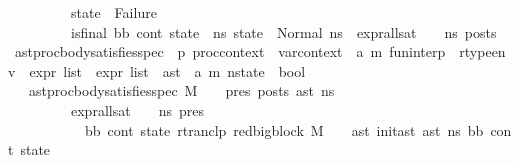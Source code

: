 \begin{isabellebody}
\ \ \ \ \ \ \ \ \ state\ {\isasymnoteq}\ Failure\ {\isasymand}\ \isanewline
\ \ \ \ \ \ \ \ \ {\isacharparenleft}{\kern0pt}is{\isacharunderscore}{\kern0pt}final\ {\isacharparenleft}{\kern0pt}bb{\isacharcomma}{\kern0pt}\ cont{\isacharcomma}{\kern0pt}\ state{\isacharparenright}{\kern0pt}\ {\isasymlongrightarrow}\ {\isacharparenleft}{\kern0pt}{\isasymforall}ns{\isacharprime}{\kern0pt}{\isachardot}{\kern0pt}\ state\ {\isacharequal}{\kern0pt}\ Normal\ ns{\isacharprime}{\kern0pt}\ {\isasymlongrightarrow}\ expr{\isacharunderscore}{\kern0pt}all{\isacharunderscore}{\kern0pt}sat\ {\isasymLambda}\ {\isasymGamma}\ {\isasymOmega}\ ns{\isacharprime}{\kern0pt}\ posts{\isacharparenright}{\kern0pt}{\isacharparenright}{\kern0pt}{\isachardoublequoteclose}\isanewline
\isanewline
{}\isamarkupfalse%
\ ast{\isacharunderscore}{\kern0pt}proc{\isacharunderscore}{\kern0pt}body{\isacharunderscore}{\kern0pt}satisfies{\isacharunderscore}{\kern0pt}spec\ {\isacharcolon}{\kern0pt}{\isacharcolon}{\kern0pt}\ {\isachardoublequoteopen}{\isacharprime}{\kern0pt}p\ proc{\isacharunderscore}{\kern0pt}context\ {\isasymRightarrow}\ var{\isacharunderscore}{\kern0pt}context\ {\isasymRightarrow}\ {\isacharparenleft}{\kern0pt}{\isacharprime}{\kern0pt}a{\isacharcomma}{\kern0pt}\ {\isacharprime}{\kern0pt}m{\isacharparenright}{\kern0pt}\ fun{\isacharunderscore}{\kern0pt}interp\ {\isasymRightarrow}\ rtype{\isacharunderscore}{\kern0pt}env\ {\isasymRightarrow}\ expr\ list\ {\isasymRightarrow}\ expr\ list\ {\isasymRightarrow}\ ast\ {\isasymRightarrow}\ {\isacharparenleft}{\kern0pt}{\isacharprime}{\kern0pt}a{\isacharcomma}{\kern0pt}\ {\isacharprime}{\kern0pt}m{\isacharparenright}{\kern0pt}\ nstate\ {\isasymRightarrow}\ bool{\isachardoublequoteclose}\isanewline
\ \ \ {\isachardoublequoteopen}ast{\isacharunderscore}{\kern0pt}proc{\isacharunderscore}{\kern0pt}body{\isacharunderscore}{\kern0pt}satisfies{\isacharunderscore}{\kern0pt}spec\ M\ {\isasymLambda}\ {\isasymGamma}\ {\isasymOmega}\ pres\ posts\ ast\ ns\ {\isasymequiv}\isanewline
\ \ \ \ \ \ \ \ \ expr{\isacharunderscore}{\kern0pt}all{\isacharunderscore}{\kern0pt}sat\ {\isasymLambda}\ {\isasymGamma}\ {\isasymOmega}\ ns\ pres\ {\isasymlongrightarrow}\ \isanewline
\ \ \ \ \ \ \ \ \ \ {\isacharparenleft}{\kern0pt}{\isasymforall}\ bb\ cont\ state{\isachardot}{\kern0pt}\ {\isacharparenleft}{\kern0pt}rtranclp\ {\isacharparenleft}{\kern0pt}red{\isacharunderscore}{\kern0pt}bigblock\ M\ {\isasymLambda}\ {\isasymGamma}\ {\isasymOmega}\ ast{\isacharparenright}{\kern0pt}\ {\isacharparenleft}{\kern0pt}init{\isacharunderscore}{\kern0pt}ast\ ast\ ns{\isacharparenright}{\kern0pt}\ {\isacharparenleft}{\kern0pt}bb{\isacharcomma}{\kern0pt}\ cont{\isacharcomma}{\kern0pt}\ state{\isacharparenright}{\kern0pt}{\isacharparenright}{\kern0pt}\ {\isasymlongrightarrow}\ \isanewline

\end{isabellebody}
